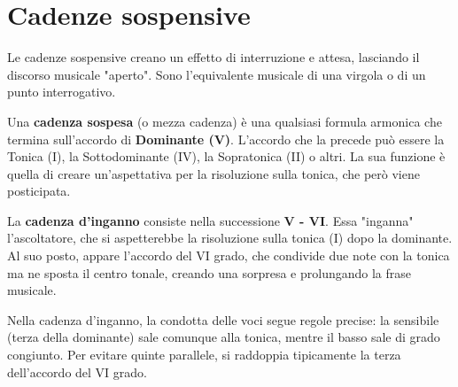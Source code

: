 	\begin{esempio}
		\label{ex:cadenza_plagale}
	\end{esempio}
	
	\section{Cadenze sospensive}
	\label{sec:cadenze_sospensive}
	
	Le cadenze sospensive creano un effetto di interruzione e attesa, lasciando il discorso musicale "aperto". Sono l'equivalente musicale di una virgola o di un punto interrogativo.
	
	\begin{definizione}
		\label{def:cadenza_sospesa}
		Una \textbf{cadenza sospesa} (o mezza cadenza) è una qualsiasi formula armonica che termina sull'accordo di \textbf{Dominante (V)}. L'accordo che la precede può essere la Tonica (I), la Sottodominante (IV), la Sopratonica (II) o altri. La sua funzione è quella di creare un'aspettativa per la risoluzione sulla tonica, che però viene posticipata.
	\end{definizione}
	
	\begin{esempio}
		\label{ex:cadenza_sospesa}
	\end{esempio}
	
	\begin{definizione}
		\label{def:cadenza_inganno}
		La \textbf{cadenza d'inganno} consiste nella successione \textbf{V - VI}. Essa "inganna" l'ascoltatore, che si aspetterebbe la risoluzione sulla tonica (I) dopo la dominante. Al suo posto, appare l'accordo del VI grado, che condivide due note con la tonica ma ne sposta il centro tonale, creando una sorpresa e prolungando la frase musicale.
	\end{definizione}
	
	Nella cadenza d'inganno, la condotta delle voci segue regole precise: la sensibile (terza della dominante) sale comunque alla tonica, mentre il basso sale di grado congiunto. Per evitare quinte parallele, si raddoppia tipicamente la terza dell'accordo del VI grado.
	
	\begin{esempio}
		\label{ex:cadenza_inganno}
	\end{esempio}
	
